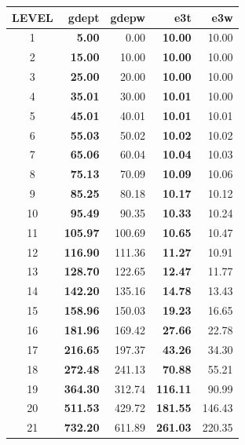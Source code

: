 {%
\begin{table}     \begin{center} \begin{tabular}{c||r|r|r|r}
\hline
\textbf{LEVEL}& \textbf{gdept}& \textbf{gdepw}& \textbf{e3t }& \textbf{e3w  } \\ \hline
1	&	\textbf{  5.00}	&       0.00 &	\textbf{ 10.00} &	 10.00 \\	\hline
2	&	\textbf{15.00}	& 	  10.00 &	\textbf{ 10.00} &	 10.00 \\	\hline
3	&	\textbf{25.00}	&	  20.00 &	\textbf{ 10.00} & 	 10.00 \\	\hline
4	&	\textbf{35.01}	&	  30.00 & 	\textbf{ 10.01} & 	 10.00 \\	\hline
5	&	\textbf{45.01}	&	  40.01 &	\textbf{ 10.01} &	 10.01 \\	\hline
6	&	\textbf{55.03}	&	  50.02 &	\textbf{ 10.02} & 	 10.02 \\	\hline
7	&	\textbf{65.06}	&	  60.04 &	\textbf{ 10.04} &	 10.03 \\	\hline
8	&	\textbf{75.13}	&	  70.09 &	\textbf{ 10.09} &	 10.06 \\	\hline
9	&	\textbf{85.25}	&	  80.18 &	\textbf{ 10.17} &	 10.12 \\	\hline
10	& 	\textbf{95.49}	& 	  90.35 &	\textbf{ 10.33} &	 10.24 \\	\hline
11	& 	\textbf{105.97}	& 	 100.69 &	\textbf{ 10.65} &	 10.47 \\	\hline
12	& 	\textbf{116.90}	& 	 111.36 &	\textbf{ 11.27} &	 10.91 \\	\hline
13	& 	\textbf{128.70}	& 	 122.65 &	\textbf{ 12.47} &	 11.77 \\	\hline
14	& 	\textbf{142.20}	& 	 135.16 &	\textbf{ 14.78} &	 13.43 \\	\hline
15	& 	\textbf{158.96}	& 	 150.03 &	\textbf{ 19.23} &	 16.65 \\	\hline
16	& 	\textbf{181.96}	& 	 169.42 &	\textbf{ 27.66} &	 22.78 \\	\hline
17	& 	\textbf{216.65}	& 	 197.37 & 	\textbf{ 43.26} &	 34.30 \\ \hline
18	& 	\textbf{272.48}	& 	 241.13 & 	\textbf{ 70.88} &	 55.21 \\ \hline
19	& 	\textbf{364.30}	& 	 312.74 & 	\textbf{116.11} &	 90.99 \\ \hline
20	& 	\textbf{511.53}	& 	 429.72 & 	\textbf{181.55} & 	146.43 \\ \hline
21	& 	\textbf{732.20}	& 	 611.89 & 	\textbf{261.03} & 	220.35 \\ \hline

\end{tabular}
\end{center}
\end{table}}
